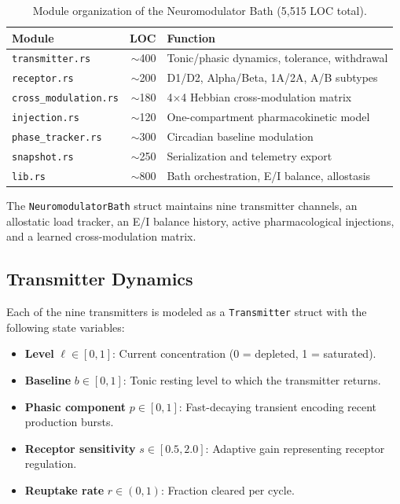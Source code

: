 \documentclass[11pt,a4paper]{article}
\begin{document}
\begin{table}[h]
\centering
\caption{Module organization of the Neuromodulator Bath (5,515 LOC total).}
\label{tab:modules}
\begin{tabular}{lrl}
\toprule
\textbf{Module} & \textbf{LOC} & \textbf{Function} \\
\midrule
\texttt{transmitter.rs} & $\sim$400 & Tonic/phasic dynamics, tolerance, withdrawal \\
\texttt{receptor.rs} & $\sim$200 & D1/D2, Alpha/Beta, 1A/2A, A/B subtypes \\
\texttt{cross\_modulation.rs} & $\sim$180 & 4$\times$4 Hebbian cross-modulation matrix \\
\texttt{injection.rs} & $\sim$120 & One-compartment pharmacokinetic model \\
\texttt{phase\_tracker.rs} & $\sim$300 & Circadian baseline modulation \\
\texttt{snapshot.rs} & $\sim$250 & Serialization and telemetry export \\
\texttt{lib.rs} & $\sim$800 & Bath orchestration, E/I balance, allostasis \\
\bottomrule
\end{tabular}
\end{table}

The \texttt{NeuromodulatorBath} struct maintains nine transmitter channels, an allostatic load tracker, an E/I balance history, active pharmacological injections, and a learned cross-modulation matrix.

\subsection{Transmitter Dynamics}

Each of the nine transmitters is modeled as a \texttt{Transmitter} struct with the following state variables:

\begin{itemize}
  \item \textbf{Level} $\ell \in [0, 1]$: Current concentration (0 = depleted, 1 = saturated).
  \item \textbf{Baseline} $b \in [0, 1]$: Tonic resting level to which the transmitter returns.
  \item \textbf{Phasic component} $p \in [0, 1]$: Fast-decaying transient encoding recent production bursts.
  \item \textbf{Receptor sensitivity} $s \in [0.5, 2.0]$: Adaptive gain representing receptor regulation.
  \item \textbf{Reuptake rate} $r \in (0, 1)$: Fraction cleared per cycle.
\end{itemize}
\end{document}
